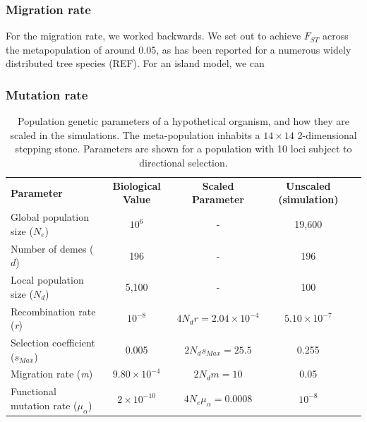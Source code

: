 \documentclass[11pt,twoside,lineno]{GSA_format}
\begin{document}
\subsubsection{Migration rate} 

For the migration rate, we worked backwards. We set out to achieve $F_{ST}$ across the metapopulation of around 0.05, as has been reported for a numerous widely distributed tree species (REF). For an island model, we can 

\subsubsection{Mutation rate} 


\begin{table}[]
\label{SimulationParameters}
\caption{Population genetic parameters of a hypothetical organism, and how they are scaled in the simulations. The meta-population inhabits a $14\times14$ 2-dimensional stepping stone. Parameters are shown for a population with 10 loci subject to directional selection.}
\begin{tabular}{lcccl}
\cline{1-4}
\textbf{Parameter} & \textbf{Biological Value} & \textbf{Scaled Parameter}        & \textbf{Unscaled (simulation)} \\ \cline{1-4}
Global population size ($N_e$)                 & $10^6$                                      & -                           & 19,600                                              &           \\
Number of demes ($d$)                  & 196                                      & -                           & 196                                                &           \\
Local population size ($N_d$)                  & 5,100                                      & -                           & 100                                                &           \\
Recombination rate (\textit{r})                        & $10^{-8}$                                      & $4N_dr = 2.04 \times 10^{-4}$ & $5.10 \times 10^{-7}$                                           &           \\
Selection coefficient (\textit{$s_{Max}$})                        & 0.005                                         & $2N_ds_{Max}= 25.5$ & 0.255                                           &           \\
Migration rate (\textit{m})                        & $9.80\times 10^{-4}$                                      & $2N_dm = 10$        & 0.05                                               &           \\
Functional mutation rate (\textit{$\mu_\alpha$})                        & $2\times 10^{-10}$                                      & $4N_e\mu_\alpha = 0.0008$        & $10^{-8}$ &           \\ \cline{1-4}
\end{tabular}
\end{table}
\end{document}
